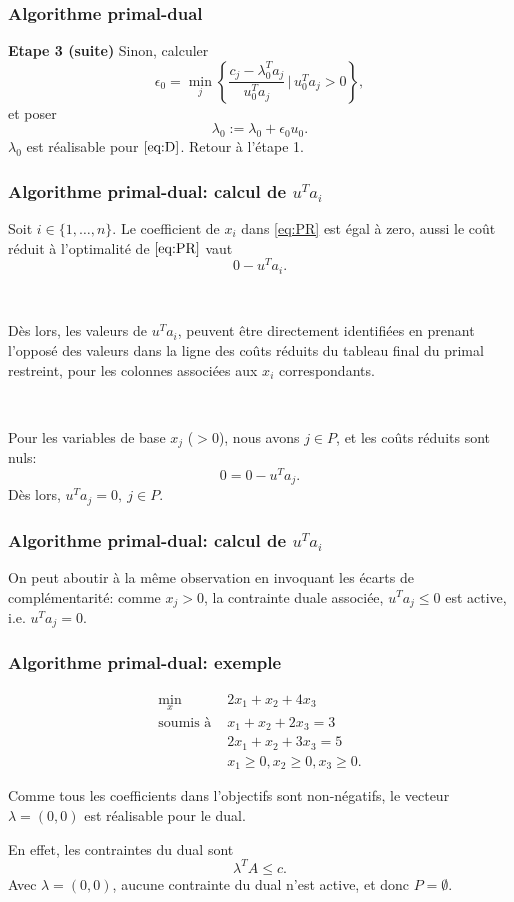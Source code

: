 \documentclass[t, aspectratio=169, usepdftitle=false]{beamer}
\begin{document}
\begin{frame}
\frametitle{Algorithme primal-dual}

{\bf Etape 3 (suite)}
Sinon, calculer
$$
\epsilon_0 = \min_j \left\lbrace \frac{c_j - \lambda_0^Ta_j}{u_0^T a_j} \,\bigg|\, u_0^Ta_j > 0\right\rbrace,
$$
et poser
\[
\lambda_0 := \lambda_0 + \epsilon_0 u_0.
\]
$\lambda_0$ est réalisable pour $\eqref{eq:D}$.
Retour à l'étape 1.

\end{frame}

\begin{frame}
	\frametitle{Algorithme primal-dual: calcul de $u^Ta_i$}
	
	Soit $i \in \{1,\ldots,n\}$.
	Le coefficient de $x_i$ dans \eqref{eq:PR} est égal à zero, aussi le coût réduit à l'optimalité de $\eqref{eq:PR}$ vaut
	$$
	0 - u^Ta_i.
	$$
	
	\ 
	
	Dès lors, les valeurs de $u^Ta_i$, peuvent être directement identifiées en prenant l'opposé des valeurs dans la ligne des coûts réduits du tableau final du primal restreint, pour les colonnes associées aux $x_i$ correspondants.
	
	\
	
	Pour les variables de base $x_j$ ($> 0$), nous avons $j \in P$, et les coûts réduits sont nuls:
	$$
	0 = 0 - u^Ta_j.
	$$
	Dès lors, $u^T a_j = 0,\ j \in P$.
	
\end{frame}

\begin{frame}
	\frametitle{Algorithme primal-dual: calcul de $u^Ta_i$}
	
	On peut aboutir à la même observation en invoquant les écarts de complémentarité: comme $x_j > 0$, la contrainte duale associée, $u^T a_j \leq 0$ est active, i.e. $u^T a_j = 0$.
	
\end{frame}

\begin{frame}
\frametitle{Algorithme primal-dual: exemple}

\begin{align*}
\min_x \ & 2x_1 + x_2 + 4x_3 \\
\mbox{soumis à } & x_1 + x_2 + 2x_3 = 3 \\
& 2x_1 + x_2 + 3x_3 = 5 \\
& x_1 \geq 0, x_2 \geq 0, x_3 \geq 0.
\end{align*}

\mbox{}

Comme tous les coefficients dans l'objectifs sont non-négatifs, le vecteur $\lambda = (0,0)$ est réalisable pour le dual.

\mbox{}

En effet, les contraintes du dual sont
\[
\lambda^T A \leq c.
\]
Avec $\lambda = (0,0)$, aucune contrainte du dual n'est active, et donc $P = \emptyset$.

\end{frame}
\end{document}
